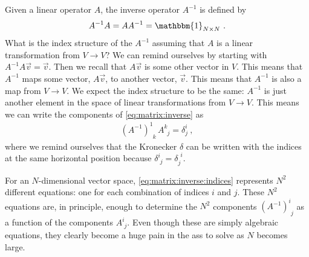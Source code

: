 \documentclass[
  11pt,
	colorful,
	raggedright,
]{tufte-style-thesis-flip}
\newcommand{\aij}[2]{^{#1}_{\phantom{#1}#2}}
\begin{document}
Given a linear operator $A$, the inverse operator $A^{-1}$ is defined by
\begin{align}
  A^{-1} A= A A^{-1} = \mathbbm{1}_{N\times N} \ .
  \label{eq:matrix:inverse}
\end{align}
What is the index structure of the $A^{-1}$ assuming that $A$ is a linear transformation from $V\to V$? We can remind ourselves by starting with $A^{-1}A\vec{v} = \vec{v}$. Then we recall that $A\vec{v}$ is some other vector in $V$. This means that $A^{-1}$ maps some vector, $A\vec{v}$, to another vector, $\vec{v}$. This means that $A^{-1}$ is also a map from $V\to V$. We expect the index structure to be the same: $A^{-1}$ is just another element in the space of linear transformations from $V\to V$. This means we can write the components of \eqref{eq:matrix:inverse} as
\begin{align}
  (A^{-1})\aij{1}{k} \, A\aij{k}{j} = \delta^i_j \ ,
  \label{eq:matrix:inverse:indices}
\end{align}
where we remind ourselves that the Kronecker $\delta$ can be written with the indices at the same horizontal position because $\delta\aij{i}{j} = \delta_j^{\phantom{j}i}$. 


For an $N$-dimensional vector space, \eqref{eq:matrix:inverse:indices} represents $N^2$ different equations: one for each combination of indices $i$ and $j$. These $N^2$ equations are, in principle, enough to determine the $N^2$ components $(A^{-1})\aij{i}{j}$ as a function of the components $A\aij{i}{j}$. Even though these are simply algebraic equations, they clearly become a huge pain in the ass to solve as $N$ becomes large. 
\end{document}
